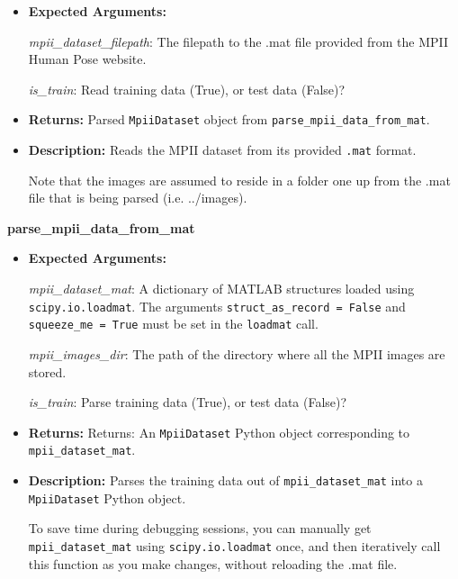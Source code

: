 \documentclass{scrreprt}
\begin{document}
\begin{itemize}
        \item \textbf{Expected Arguments:}

        \textit{mpii\_dataset\_filepath}: The filepath to the .mat file provided from the
            MPII Human Pose website.

        \textit{is\_train}: Read training data (True), or test data (False)?

        \item \textbf{Returns:} Parsed \verb|MpiiDataset| object from
                \verb|parse_mpii_data_from_mat|.

        \item \textbf{Description:} Reads the MPII dataset from its provided
                \verb|.mat| format.

                Note that the images are assumed to reside in a folder one up from the .mat
                file that is being parsed (i.e. ../images).
\end{itemize}

\textbf{parse\_mpii\_data\_from\_mat}

\begin{itemize}
        \item \textbf{Expected Arguments:}

        \textit{mpii\_dataset\_mat}: A dictionary of MATLAB structures loaded using
            \verb|scipy.io.loadmat|. The arguments \verb|struct_as_record = False| and
            \verb|squeeze_me = True| must be set in the \verb|loadmat| call.

        \textit{mpii\_images\_dir}: The path of the directory where all the
                MPII images are stored.

        \textit{is\_train}: Parse training data (True), or test data (False)?

        \item \textbf{Returns:} Returns: An \verb|MpiiDataset| Python object
                corresponding to \verb|mpii_dataset_mat|.

        \item \textbf{Description:} Parses the training data out of
                \verb|mpii_dataset_mat| into a \verb|MpiiDataset| Python object.

                To save time during debugging sessions, you can manually get
                \verb|mpii_dataset_mat| using \verb|scipy.io.loadmat| once, and
                then iteratively call this function as you make changes,
                without reloading the .mat file.
\end{itemize}
\end{document}
